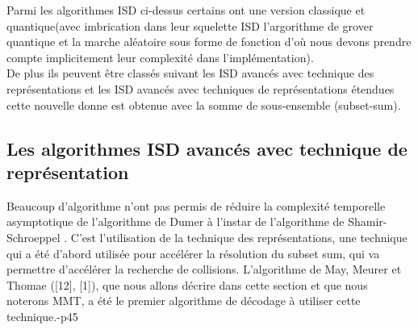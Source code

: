 \documentclass[12pt,openany]{report}
\begin{document}
Parmi les algorithmes ISD  ci-dessus  
certains ont une version classique et quantique(avec imbrication dans leur squelette ISD l'argorithme de grover quantique et la marche aléatoire sous forme de fonction d'où nous devons prendre compte implicitement leur complexité dans l'implémentation).\\
 De plus ils peuvent être classés suivant les ISD avancés avec technique des représentations et les ISD avancés avec techniques de représentations étendues cette nouvelle donne est obtenue avec la somme de sous-ensemble (subset-sum).
 
 \subsection{Les algorithmes ISD avancés avec technique de représentation}

Beaucoup d'algorithme n'ont pas permis  de réduire  la
complexité temporelle asymptotique de l’algorithme de Dumer à l'instar de l’algorithme de Shamir-Schroeppel . C’est l’utilisation
de la technique des représentations, une technique qui a été d’abord utilisée pour
accélérer la résolution du subset sum, qui va permettre d’accélérer la recherche
de collisions. L’algorithme de May, Meurer et Thomae ([12], [1]), que nous
allons décrire dans cette section et que nous noterons MMT, a été le premier
algorithme de décodage à utiliser cette technique.\cite{Ghazal}-p45
\end{document}
